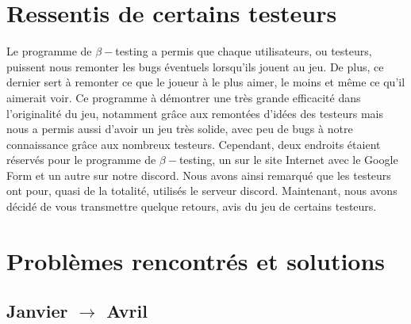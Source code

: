 \documentclass[a4paper,12pt]{article}
\begin{document}
        
        
    \section{Ressentis de certains testeurs}
        Le programme de \(\beta-\)testing a permis que chaque utilisateurs, ou testeurs, puissent nous remonter les bugs éventuels lorsqu'ils jouent au jeu. De plus, ce dernier sert à remonter ce que le joueur à le plus aimer, le moins et même ce qu'il aimerait voir. Ce programme à démontrer une très grande efficacité dans l'originalité du jeu, notamment grâce aux remontées d'idées des testeurs mais nous a permis aussi d'avoir un jeu très solide, avec peu de bugs à notre connaissance grâce aux nombreux testeurs. Cependant, deux endroits étaient réservés pour le programme de \(\beta-\)testing, un sur le site Internet avec le Google Form et un autre sur notre discord. Nous avons ainsi remarqué que les testeurs ont pour, quasi de la totalité, utilisés le serveur discord.
        Maintenant, nous avons décidé de vous transmettre quelque retours, avis du jeu de certains testeurs.
        
        
    
    
    
    \section{Problèmes rencontrés et solutions}
        \subsection{Janvier $\to$ Avril}
        
\end{document}
